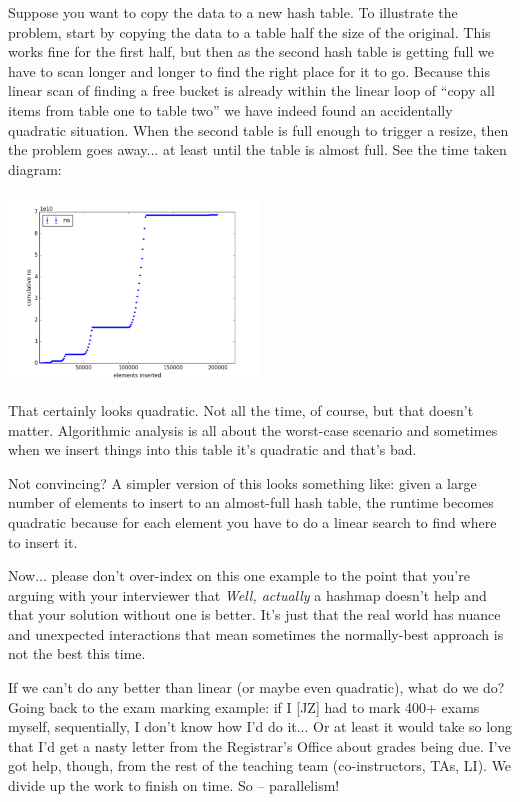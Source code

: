 Suppose you want to copy the data to a new hash table. To illustrate the problem, start by copying the data to a table half the size of the original. This works fine for the first half, but then as the second hash table is getting full we have to scan longer and longer to find the right place for it to go. Because this linear scan of finding a free bucket is already within the linear loop of ``copy all items from table one to table two'' we have indeed found an accidentally quadratic situation. When the second table is full enough to trigger a resize, then the problem goes away... at least until the table is almost full. See the time taken diagram:

\begin{center}
  \includegraphics[width=0.5\textwidth]{images/robinhoodhashing.png}
\end{center}

That certainly looks quadratic. Not all the time, of course, but that doesn't matter. Algorithmic analysis is all about the worst-case scenario and sometimes when we insert things into this table it's quadratic and that's bad. 

Not convincing? A simpler version of this looks something like: given a large number of elements to insert to an almost-full hash table, the runtime becomes quadratic because for each element you have to do a linear search to find where to insert it.

Now... please don't over-index on this one example to the point that you're arguing with your interviewer that \textit{Well, actually} a hashmap doesn't help and that your solution without one is better. It's just that the real world has nuance and unexpected interactions that mean sometimes the normally-best approach is not the best this time. 

If we can't do any better than linear (or maybe even quadratic), what do we do? Going back to the exam marking example: if I [JZ] had to mark 400+ exams myself, sequentially, I don't know how I'd do it... Or at least it would take so long that I'd get a nasty letter from the Registrar's Office about grades being due. I've got help, though, from the rest of the teaching team (co-instructors, TAs, LI). We divide up the work to finish on time. So -- parallelism!


